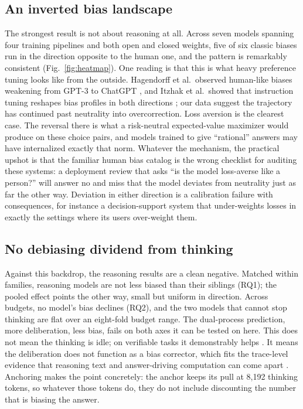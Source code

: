 \documentclass[conference]{IEEEtran}
\begin{document}
\subsection{An inverted bias landscape}
The strongest result is not about reasoning at all. Across seven models spanning four training pipelines and both open and closed weights, five of six classic biases run in the direction opposite to the human one, and the pattern is remarkably consistent (Fig.~\ref{fig:heatmap}). One reading is that this is what heavy preference tuning looks like from the outside. Hagendorff et al.\ observed human-like biases weakening from GPT-3 to ChatGPT \cite{hagendorff2023human}, and Itzhak et al.\ showed that instruction tuning reshapes bias profiles in both directions \cite{itzhak2024instructed}; our data suggest the trajectory has continued past neutrality into overcorrection. Loss aversion is the clearest case. The reversal there is what a risk-neutral expected-value maximizer would produce on these choice pairs, and models trained to give ``rational'' answers may have internalized exactly that norm. Whatever the mechanism, the practical upshot is that the familiar human bias catalog is the wrong checklist for auditing these systems: a deployment review that asks ``is the model loss-averse like a person?'' will answer no and miss that the model deviates from neutrality just as far the other way. Deviation in either direction is a calibration failure with consequences, for instance a decision-support system that under-weights losses in exactly the settings where its users over-weight them.

\subsection{No debiasing dividend from thinking}
Against this backdrop, the reasoning results are a clean negative. Matched within families, reasoning models are not less biased than their siblings (RQ1); the pooled effect points the other way, small but uniform in direction. Across budgets, no model's bias declines (RQ2), and the two models that cannot stop thinking are flat over an eight-fold budget range. The dual-process prediction, more deliberation, less bias, fails on both axes it can be tested on here. This does not mean the thinking is idle; on verifiable tasks it demonstrably helps \cite{snell2024scaling}. It means the deliberation does not function as a bias corrector, which fits the trace-level evidence that reasoning text and answer-driving computation can come apart \cite{turpin2023language, chen2025reasoning, shojaee2025illusion}. Anchoring makes the point concretely: the anchor keeps its pull at 8,192 thinking tokens, so whatever those tokens do, they do not include discounting the number that is biasing the answer.
\end{document}
